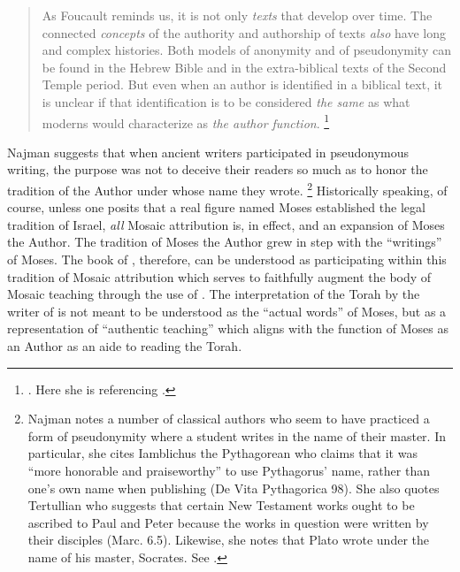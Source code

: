 \begin{quote}
    As Foucault reminds us, it is not only \emph{texts} that develop over time. The connected \emph{concepts} of the authority and authorship of texts \emph{also} have long and complex histories. Both models of anonymity and of pseudonymity can be found in the Hebrew Bible and in the extra-biblical texts of the Second Temple period. But even when an author is identified in a biblical text, it is unclear if that identification is to be considered \emph{the same} as what moderns would characterize as \emph{the author function}.%
        \footnote{%
            \cite[9--10]{najman2003}. Here she is referencing
            \cite[213]{foucault_essential-foucault_2}.}
\end{quote}
\noindent
Najman suggests that when ancient writers participated in pseudonymous writing, the purpose was not to deceive their readers so much as to honor the tradition of the Author under whose name they wrote.%
    \footnote{Najman notes a number of classical authors who seem to have practiced a form of pseudonymity where a student writes in the name of their master. In particular, she cites Iamblichus the Pythagorean who claims that it was ``more honorable and praiseworthy'' to use Pythagorus' name, rather than one's own name when publishing (De Vita Pythagorica 98). She also quotes Tertullian who suggests that certain New Testament works ought to be ascribed to Paul and Peter because the works in question were written by their disciples (Marc. 6.5). Likewise, she notes that Plato wrote under the name of his master, Socrates. See \cite[13]{najman2003}.}
Historically speaking, of course, unless one posits that a real figure named Moses established the legal tradition of Israel, \emph{all} Mosaic attribution is, in effect, \psgraphical and an expansion of Moses the Author. The tradition of Moses the Author grew in step with the ``writings'' of Moses. The book of \jub, therefore, can be understood as participating within this tradition of Mosaic attribution which serves to faithfully augment the body of Mosaic teaching through the use of \psy. The interpretation of the Torah by the writer of \jub is not meant to be understood as the ``actual words'' of Moses, but as a representation of ``authentic teaching'' which aligns with the function of Moses as an Author as an aide to reading the Torah.\autocite[13]{najman2003}


